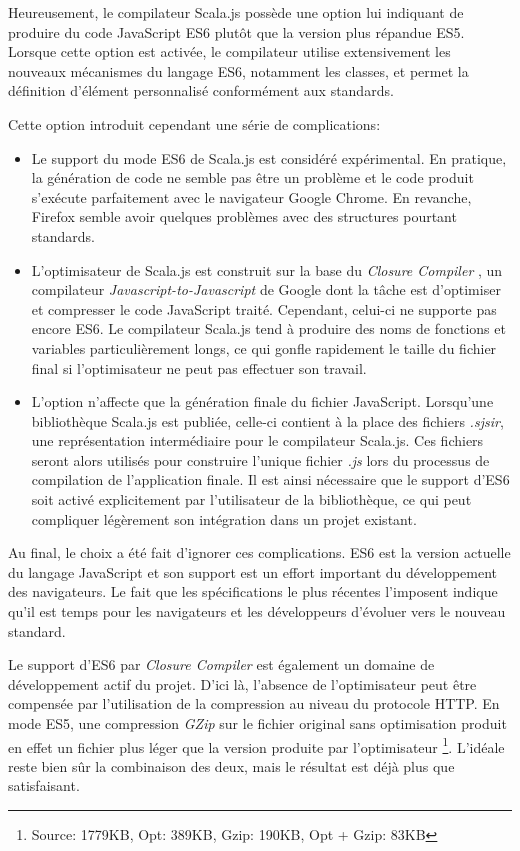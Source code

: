 Heureusement, le compilateur Scala.js possède une option lui indiquant de produire du code JavaScript ES6 plutôt que la version plus répandue ES5. Lorsque cette option est activée, le compilateur utilise extensivement les nouveaux mécanismes du langage ES6, notamment les classes, et permet la définition d'élément personnalisé conformément aux standards.

Cette option introduit cependant une série de complications:

\begin{itemize}
	\item Le support du mode ES6 de Scala.js est considéré expérimental. En pratique, la génération de code ne semble pas être un problème et le code produit s'exécute parfaitement avec le navigateur Google Chrome. En revanche, Firefox semble avoir quelques problèmes avec des structures pourtant standards.
	\item L'optimisateur de Scala.js est construit sur la base du \emph{Closure Compiler} \cite{closure-compiler}, un compilateur \emph{Javascript-to-Javascript} de Google dont la tâche est d'optimiser et compresser le code JavaScript traité. Cependant, celui-ci ne supporte pas encore ES6. Le compilateur Scala.js tend à produire des noms de fonctions et variables particulièrement longs, ce qui gonfle rapidement le taille du fichier final si l'optimisateur ne peut pas effectuer son travail.
	\item L'option n'affecte que la génération finale du fichier JavaScript. Lorsqu'une bibliothèque Scala.js est publiée, celle-ci contient à la place des fichiers \emph{.sjsir}, une représentation intermédiaire pour le compilateur Scala.js. Ces fichiers seront alors utilisés pour construire l'unique fichier \emph{.js} lors du processus de compilation de l'application finale. Il est ainsi nécessaire que le support d'ES6 soit activé explicitement par l'utilisateur de la bibliothèque, ce qui peut compliquer légèrement son intégration dans un projet existant.
\end{itemize}

Au final, le choix a été fait d'ignorer ces complications. ES6 est la version actuelle du langage JavaScript et son support est un effort important du développement des navigateurs. Le fait que les spécifications le plus récentes l'imposent indique qu'il est temps pour les navigateurs et les développeurs d'évoluer vers le nouveau standard.

Le support d'ES6 par \emph{Closure Compiler} est également un domaine de développement actif du projet. D'ici là, l'absence de l'optimisateur peut être compensée par l'utilisation de la compression au niveau du protocole HTTP. En mode ES5, une compression \emph{GZip} sur le fichier original sans optimisation produit en effet un fichier plus léger que la version produite par l'optimisateur \footnote{Source: 1779KB, Opt: 389KB, Gzip: 190KB, Opt + Gzip: 83KB}. L'idéale reste bien sûr la combinaison des deux, mais le résultat est déjà plus que satisfaisant.

